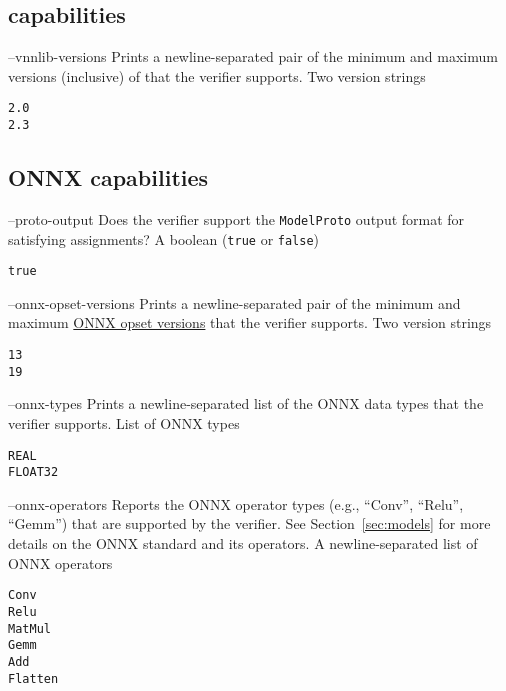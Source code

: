 \subsection{\vnnlib{} capabilities}

\clOutputOption
{--vnnlib-versions}
{Prints a newline-separated pair of the minimum and maximum versions (inclusive) of \vnnlib{} that the verifier supports.}
{Two version strings}
\begin{lstlisting}[style=bash]
%*\exampleVerifier* supports --vnnlib-versions
2.0
2.3
\end{lstlisting}

\subsection{ONNX capabilities}

\clOutputOption
{--proto-output}
{Does the verifier support the \texttt{ModelProto} output format for satisfying assignments?}
{A boolean (\texttt{true} or \texttt{false})}
\begin{lstlisting}[style=bash]
%*\exampleVerifier* supports --proto-output
true
\end{lstlisting}

\clOutputOption
{--onnx-opset-versions}
{Prints a newline-separated pair of the minimum and maximum \href{https://onnxruntime.ai/docs/reference/compatibility.html\#onnx-opset-support}{ONNX opset versions} that the verifier supports.}
{Two version strings}
\begin{lstlisting}[style=bash]
%*\exampleVerifier* supports --onnx-opset-versions
13
19
\end{lstlisting}

\clOutputOption
{--onnx-types}
{Prints a newline-separated list of the ONNX data types that the verifier supports.}
{List of ONNX types}
\begin{lstlisting}[style=bash]
%*\exampleVerifier* supports --onnx-types
REAL
FLOAT32
\end{lstlisting}

\clOutputOption
{--onnx-operators}
{Reports the ONNX operator types (e.g., ``Conv'', ``Relu'', ``Gemm'') that are supported by the verifier. See Section~\ref{sec:models} for more details on the ONNX standard and its operators.}
{A newline-separated list of ONNX operators}
\begin{lstlisting}[style=bash]
%*\exampleVerifier* supports --onnx-operators
Conv
Relu
MatMul
Gemm
Add
Flatten
\end{lstlisting}

